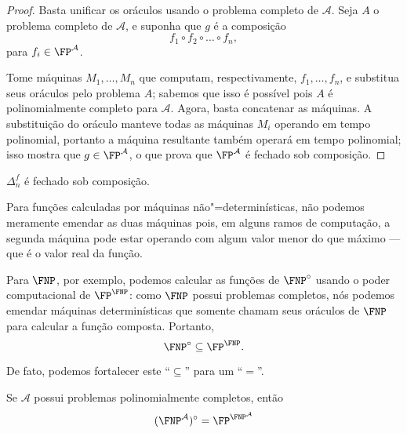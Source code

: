 \begin{proof}
    Basta unificar os oráculos usando o problema completo de $\mathcal A$.
    Seja $A$ o problema completo de $\mathcal A$,
    e suponha que $g$ é a composição
    \begin{equation*}
        f_1 \circ f_2 \circ \dots \circ f_n,
    \end{equation*}
    para $f_i \in \FP^\mathcal A$.

    Tome máquinas $M_1, \dots, M_n$ que computam,
    respectivamente, $f_1, \dots, f_n$,
    e substitua seus oráculos pelo problema $A$;
    sabemos que isso é possível pois $A$ é polinomialmente completo para $\mathcal A$.
    Agora,
    basta concatenar as máquinas.
    A substituição do oráculo manteve todas as máquinas $M_i$
    operando em tempo polinomial,
    portanto a máquina resultante também operará em tempo polinomial;
    isso mostra que $g \in \FP^\mathcal A$,
    o que prova que $\FP^\mathcal A$ é fechado sob composição.
\end{proof}

\begin{ucorollary}
    $\Delta_n^f$ é fechado sob composição.
\end{ucorollary}

Para funções calculadas por máquinas não"=determinísticas,
não podemos meramente emendar as duas máquinas
pois,
em alguns ramos de computação,
a segunda máquina pode estar operando com algum valor menor do que máximo
--- que é o valor real da função.

Para $\FNP$, por exemplo,
podemos calcular as funções de $\FNP^\circ$
usando o poder computacional de $\FP^\FNP$:
como $\FNP$ possui problemas completos,
nós podemos emendar máquinas determinísticas
que somente chamam seus oráculos de $\FNP$
para calcular a função composta.
Portanto,
\begin{equation*}
    \FNP^\circ \subseteq \FP^\FNP.
\end{equation*}

De fato,
podemos fortalecer este ``$\subseteq$'' para um ``$=$''.

\begin{theorem}
    Se $\mathcal A$ possui problemas polinomialmente completos,
    então
    \begin{equation*}
        (\FNP^\mathcal A)^\circ = \FP^{\FNP^\mathcal A}
    \end{equation*}
\end{theorem}

